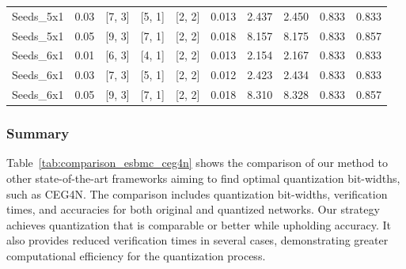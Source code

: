 \begin{table}[!htbp]
{\begin{tabular}{@{}lc ccc rrr cc@{}}
Seeds\_5x1 & 0.03 & {[7, 3]} & {[5, 1]} & {[2, 2]} & 0.013 & 2.437 & 2.450 & 0.833 & 0.833 \\
Seeds\_5x1 & 0.05 & {[9, 3]} & {[7, 1]} & {[2, 2]} & 0.018 & 8.157 & 8.175 & 0.833 & 0.857 \\
\midrule
Seeds\_6x1 & 0.01 & {[6, 3]} & {[4, 1]} & {[2, 2]} & 0.013 & 2.154 & 2.167 & 0.833 & 0.833 \\
Seeds\_6x1 & 0.03 & {[7, 3]} & {[5, 1]} & {[2, 2]} & 0.012 & 2.423 & 2.434 & 0.833 & 0.833 \\
Seeds\_6x1 & 0.05 & {[9, 3]} & {[7, 1]} & {[2, 2]} & 0.018 & 8.310 & 8.328 & 0.833 & 0.857 \\
\bottomrule
\end{tabular}%
}
\end{table}


\subsubsection*{Summary}\label{sub}
Table~\ref{tab:comparison_esbmc_ceg4n} shows the comparison of our method to other state-of-the-art frameworks aiming to find optimal quantization bit-widths, such as CEG4N. The comparison includes quantization bit-widths, verification times, and accuracies for both original and quantized networks. Our strategy achieves quantization that is comparable or better while upholding accuracy. It also provides reduced verification times in several cases, demonstrating greater computational efficiency for the quantization process.


